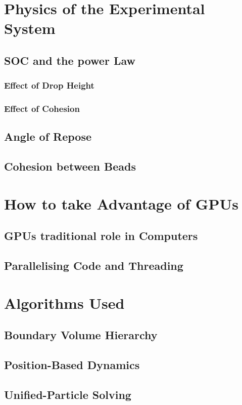 \documentclass{book}
\begin{document}
\section{Physics of the Experimental System}
\subsection{SOC and the power Law}
\subsubsection{Effect of Drop Height}
\subsubsection{Effect of Cohesion}
\subsection{Angle of Repose}
\subsection{Cohesion between Beads}

\section{How to take Advantage of GPUs}
\subsection{GPUs traditional role in Computers}
\subsection{Parallelising Code and Threading}

\section{Algorithms Used}
\subsection{Boundary Volume Hierarchy}
\subsection{Position-Based Dynamics}
\subsection{Unified-Particle Solving}
\end{document}
